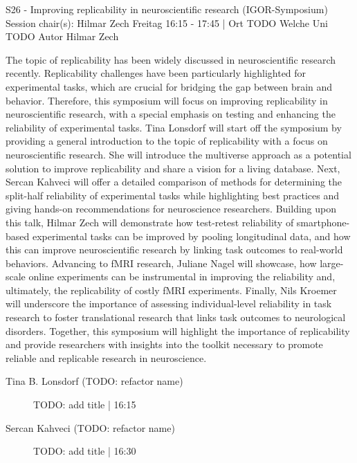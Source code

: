 
            \begin{symposium}
            {S26 - Improving replicability in neuroscientific research (IGOR-Symposium)}
            {Session chair(s): Hilmar Zech}
            {Freitag 16:15 - 17:45 | Ort TODO}
            {Welche Uni TODO}
            Autor Hilmar Zech

The topic of replicability has been widely discussed in neuroscientific research recently. Replicability challenges have been particularly highlighted for experimental tasks, which are crucial for bridging the gap between brain and behavior. Therefore, this symposium will focus on improving replicability in neuroscientific research, with a special emphasis on testing and enhancing the reliability of experimental tasks. Tina Lonsdorf will start off the symposium by providing a general introduction to the topic of replicability with a focus on neuroscientific research. She will introduce the multiverse approach as a potential solution to improve replicability and share a vision for a living database. Next, Sercan Kahveci will offer a detailed comparison of methods for determining the split-half reliability of experimental tasks while highlighting best practices and giving hands-on recommendations for neuroscience researchers. Building upon this talk, Hilmar Zech will demonstrate how test-retest reliability of smartphone-based experimental tasks can be improved by pooling longitudinal data, and how this can improve neuroscientific research by linking task outcomes to real-world behaviors. Advancing to fMRI research, Juliane Nagel will showcase, how large-scale online experiments can be instrumental in improving the reliability and, ultimately, the replicability of costly fMRI experiments. Finally, Nils Kroemer will underscore the importance of assessing individual-level reliability in task research to foster translational research that links task outcomes to neurological disorders. Together, this symposium will highlight the importance of replicability and provide researchers with insights into the toolkit necessary to promote reliable and replicable research in neuroscience.
            \begin{description}    
            
                \item [Tina B. Lonsdorf (TODO: refactor name)] TODO: add title \textcolor{mygray}{ | 16:15}    
                
                \item [Sercan Kahveci  (TODO: refactor name)] TODO: add title \textcolor{mygray}{ | 16:30}    
                

\end{description}
\end{symposium}
